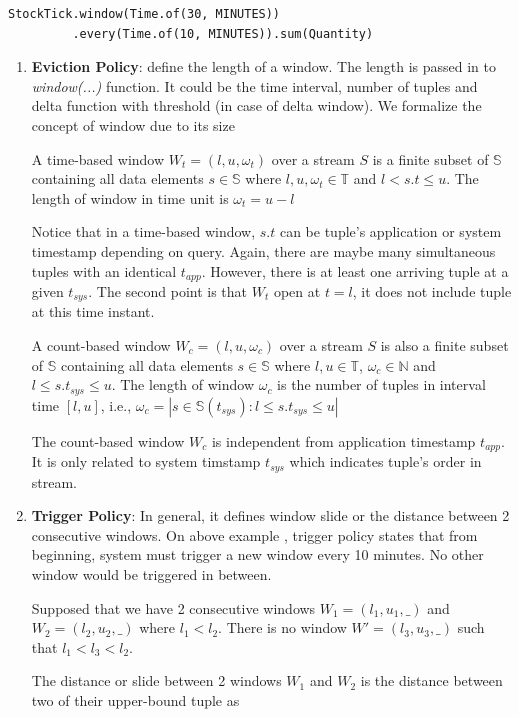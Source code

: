 \begin{verbatim}
StockTick.window(Time.of(30, MINUTES))
		 .every(Time.of(10, MINUTES)).sum(Quantity)
\end{verbatim}

\begin{enumerate}

\item \textbf{Eviction Policy}: define the length of a window. The length is passed in to \textit{window(...)} function. It could be the time interval, number of tuples and delta function with threshold (in case of delta window).
We formalize the concept of window due to its size

\begin{defi}
A time-based window $W_{t} = (l,u,\omega_t)$ over a stream $S$ is a finite subset of  $\mathbb{S}$ containing all data elements $s \in \mathbb{S}$ where $l , u, \omega_t \in \mathbb{T}$ and $l < s.t \leq u$. The length of window in time unit is $\omega_t = u-l$
\end{defi}
Notice that in a time-based window, $s.t$ can be tuple's application or system timestamp depending on query. Again, there are maybe many simultaneous tuples with an identical $t_{app}$. However, there is at least one arriving tuple at a given $t_{sys}$. The second point is that $W_t$ open at $t = l$, it does not include tuple at this time instant.

\begin{defi}
A count-based window $W_{c} = (l,u,\omega_c)$ over a stream $S$ is also a finite subset of  $\mathbb{S}$ containing all data elements $s \in \mathbb{S}$ where $l,u \in \mathbb{T}$, $\omega_c \in \mathbb{N}$ and $l \leq s.t_{sys} \leq u$. The length of window $\omega_c$ is the number of tuples in interval time $[l, u]$, i.e., $\omega_c = | {s \in \mathbb{S}(t_{sys}): l \leq s.t_{sys} \leq u}|$
\end{defi}
The count-based window $W_{c}$ is independent from application timestamp $t_{app}$. It is only related to system timstamp $t_{sys}$ which indicates tuple's order in stream. 


\item \textbf{Trigger Policy}: In general, it defines window slide or the distance between 2 consecutive windows. On above example , trigger policy states that from beginning, system must trigger a new window every 10 minutes. No other window would be triggered in between.

Supposed that we have 2 consecutive windows $W_1 = (l_1, u_1, \_)$ and $W_2 = (l_2, u_2, \_)$  where $l_1 < l_2$. There is no window $W' = (l_3, u_3, \_)$ such that $l_1< l_3 < l_2$.
\begin{defi}
The distance or slide between 2 windows $W_1$ and $W_2$ is the distance between two of their upper-bound tuple as
\begin{itemize}



\end{itemize}
\end{defi}
\end{enumerate}
